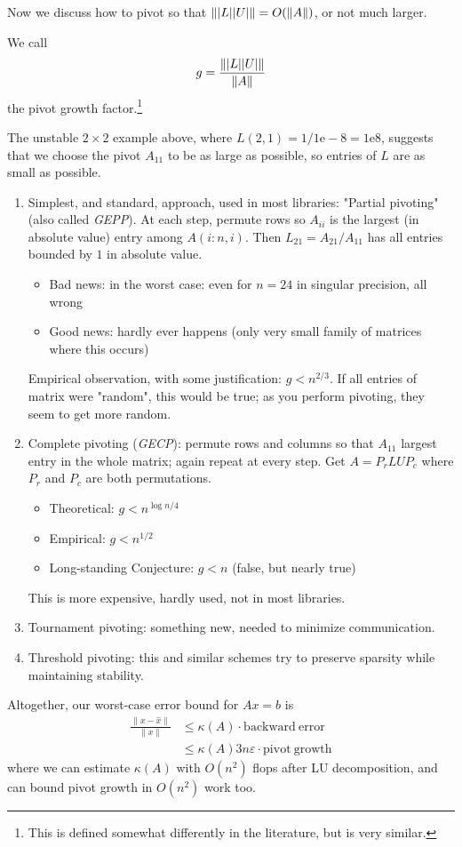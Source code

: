 \documentclass[11pt]{article}
\numberwithin{equation}{section}
\begin{document}
Now we discuss how to pivot so that $\left\| |L||U| \right\| = O( \left\| A \right\|)$, or not much larger.
\begin{definition}
    We call \begin{align*}
        g = \frac{\left\| |L||U| \right\|}{\left\| A \right\|}
    \end{align*}
    the pivot growth factor.\footnote{This is defined somewhat differently in the literature, but is very similar.}
\end{definition}
The unstable $2\times 2$ example above, where $L(2,1) = 1/1\mathrm{e}-8 = 1\mathrm{e}8$, suggests that we choose the pivot $A_{11}$ to be as large as possible,
so entries of $L$ are as small as possible. \begin{enumerate}
    \item Simplest, and standard, approach, used in most libraries: "Partial pivoting" (also called \textit{GEPP}).
    At each step, permute rows so $A_{ii}$ is the largest (in absolute value) entry among $A(i:n, i)$. Then $L_{21}=A_{21} / A_{11}$ has all entries bounded by $1$ in absolute value.
    \begin{itemize}
        \item Bad news: in the worst case: even for $n=24$ in singular precision, all wrong
        \item Good news: hardly ever happens (only very small family of matrices where this occurs)
    \end{itemize}
    Empirical observation, with some justification: $g < n^{2/3}$. If all entries of matrix were "random", this would be true; as you perform pivoting, they seem to get more random.
    \item Complete pivoting (\textit{GECP}): permute rows and columns so that $A_{11}$ largest entry in the whole matrix; again repeat at every step.
    Get $A = P_r LU P_c$ where $P_r$ and $P_c$ are both permutations.
    \begin{itemize}
        \item Theoretical: $g < n^{\log n / 4}$
        \item Empirical: $g < n^{1/2}$
        \item Long-standing Conjecture: $g < n$ (false, but nearly true)
    \end{itemize}
    This is more expensive, hardly used, not in most libraries.
   \item Tournament pivoting: something new, needed to minimize communication.
   \item Threshold pivoting: this and similar schemes try to preserve sparsity while maintaining stability.
\end{enumerate}
Altogether, our worst-case error bound for $Ax=b$ is \begin{align*}
    \frac{\|x-\hat{x} \|}{\| x \|} &\leq \kappa(A) \cdot \mathrm{backward\ error} \\
    &\leq \kappa(A) 3 n \varepsilon \cdot \mathrm{pivot\ growth}
\end{align*}
where we can estimate $\kappa(A)$ with $O(n^2)$ flops after LU decomposition, and can bound pivot growth in $O(n^2)$ work too.
\end{document}
